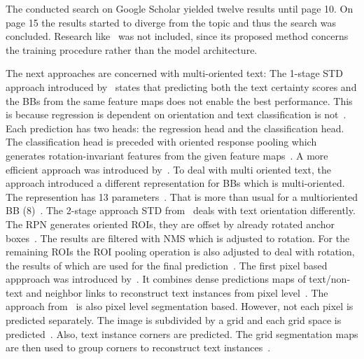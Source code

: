 The conducted search on Google Scholar yielded twelve results until page 10.
On page 15 the results started to diverge from the topic and thus the search was concluded.
Research like~\cite{xue_accurate_2018} was not included, since its proposed method concerns the
training procedure rather than the model architecture.

The next approaches are concerned with multi-oriented text:
The 1-stage \ac{STD} approach introduced by~\cite{liao_rotation-sensitive_2018} states that
predicting both the text certainty scores and the \acp{BB} from the same feature maps does not
enable the best performance.
This is because regression is dependent on orientation and text classification is
not~\citep{liao_rotation-sensitive_2018}.
Each prediction has two heads: the regression head and the classification head.
The classification head is preceded with oriented response pooling which generates rotation-invariant
features from the given feature maps~\citep{liao_rotation-sensitive_2018}.
A more efficient approach was introduced by~\citep{liao_textboxes_2018}.
To deal with multi oriented text, the approach introduced a different representation for \acp{BB}
which is multi-oriented.
The represention has 13 parameters~\citep{liao_textboxes_2018}.
That is more than usual for a multioriented \ac{BB} (8)~\citep{ma_arbitrary-oriented_2018}.
The 2-stage approach \ac{STD} from~\cite{ma_arbitrary-oriented_2018} deals with text orientation
differently.
The \ac{RPN} generates oriented \acp{ROI}, they are offset by already rotated anchor
boxes~\citep{ma_arbitrary-oriented_2018}.
The results are filtered with \ac{NMS} which is adjusted to rotation.
For the remaining \acp{ROI} the \ac{ROI} pooling operation is also adjusted to deal with rotation,
the results of which are used for the final prediction~\citep{ma_arbitrary-oriented_2018}.
The first pixel based appproach was introduced by~\cite{deng_pixellink_2018}.
It combines dense predictions maps of text/non-text and neighbor links to reconstruct text instances
from pixel level~\cite{deng_pixellink_2018}.
The approach from~\cite{lyu_multi-oriented_2018} is also pixel level segmentation based.
However, not each pixel is predicted separately.
The image is subdivided by a grid and each grid space is predicted~\citep{lyu_multi-oriented_2018}.
Also, text instance corners are predicted.
The grid segmentation maps are then used to group corners to reconstruct text
instances~\citep{lyu_multi-oriented_2018}.

